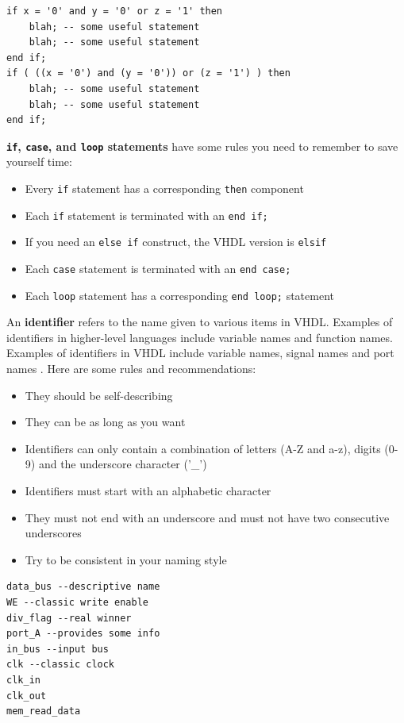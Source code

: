 \documentclass[a4paper,10pt]{IEEEtran}
\begin{document}
\begin{lstlisting}[caption={Example of parentheses that can improve clarity \cite{free-range-vhdl}.}, label={lst:parentheses_readabilty}]
if x = '0' and y = '0' or z = '1' then
    blah; -- some useful statement
    blah; -- some useful statement
end if;
if ( ((x = '0') and (y = '0')) or (z = '1') ) then
    blah; -- some useful statement
    blah; -- some useful statement
end if;
\end{lstlisting}

\textbf{\texttt{if}, \texttt{case}, and \texttt{loop} statements} have some rules you need to remember to save yourself time:
\begin{itemize}
    \item Every \texttt{if} statement has a corresponding \texttt{then} component
    \item Each \texttt{if} statement is terminated with an \texttt{end if;}
    \item If you need an \texttt{else if} construct, the VHDL version is \texttt{elsif}
    \item Each \texttt{case} statement is terminated with an \texttt{end case;}
    \item Each \texttt{loop} statement has a corresponding \texttt{end loop;} statement
\end{itemize}

An \textbf{identifier} refers to the name given to various items in VHDL. Examples
of identifiers in higher-level languages include variable names and function
names. Examples of identifiers in VHDL include variable names, signal
names and port names \cite{free-range-vhdl}. Here are some rules and recommendations:
\begin{itemize}
    \item They should be self-describing
    \item They can be as long as you want
    \item Identifiers can only contain a combination of letters (A-Z and a-z), digits (0-9) and the underscore character ('\_')
    \item Identifiers must start with an alphabetic character
    \item They must not end with an underscore and must not have two consecutive underscores
    \item Try to be consistent in your naming style
\end{itemize}

\begin{lstlisting}[caption={Valid identifiers \cite{free-range-vhdl}.}, label={lst:valid_identifiers}]
data_bus --descriptive name
WE --classic write enable
div_flag --real winner
port_A --provides some info
in_bus --input bus
clk --classic clock
clk_in
clk_out
mem_read_data
\end{lstlisting}
\end{document}
